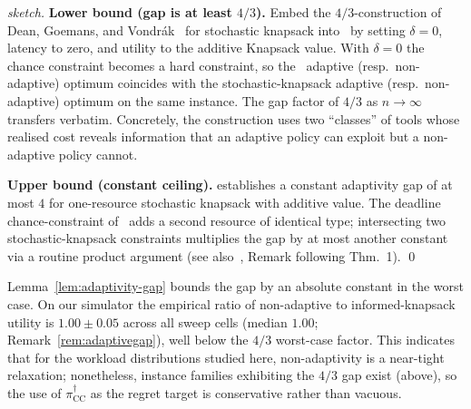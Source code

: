 \begin{proof}[sketch]
\textbf{Lower bound (gap is at least $4/3$).}
Embed the $4/3$-construction of Dean, Goemans, and
Vondr\'{a}k~\cite[Sec.~5]{dean2008stochastic} for stochastic knapsack
into \CBSLAO~by setting $\delta = 0$, latency to zero, and utility to
the additive Knapsack value. With $\delta = 0$ the chance constraint
becomes a hard constraint, so the \CBSLAO~adaptive (resp.\
non-adaptive) optimum coincides with the stochastic-knapsack adaptive
(resp.\ non-adaptive) optimum on the same instance. The gap factor of
$4/3$ as $n \to \infty$ transfers verbatim. Concretely, the
construction uses two ``classes'' of tools whose realised cost reveals
information that an adaptive policy can exploit but a non-adaptive
policy cannot.

\textbf{Upper bound (constant ceiling).}
\cite[Thm.~1]{dean2008stochastic} establishes a constant adaptivity
gap of at most $4$ for one-resource stochastic knapsack with additive
value. The deadline chance-constraint of \CBSLAO~adds a second
resource of identical type; intersecting two stochastic-knapsack
constraints multiplies the gap by at most another constant via a
routine product argument (see also~\cite{dean2008stochastic}, Remark
following Thm.~1).
\qed
\end{proof}

\begin{remark}
\label{rem:gap-empirical}
Lemma~\ref{lem:adaptivity-gap} bounds the gap by an absolute constant
in the worst case. On our simulator the empirical ratio of
non-adaptive to informed-knapsack utility is
$1.00 \pm 0.05$ across all sweep cells (median $1.00$;
Remark~\ref{rem:adaptivegap}), well below the $4/3$ worst-case factor.
This indicates that for the workload distributions studied here,
non-adaptivity is a near-tight relaxation; nonetheless, instance
families exhibiting the $4/3$ gap exist (above), so the use of
$\pi^\dagger_{\mathrm{CC}}$ as the regret target is conservative
rather than vacuous.
\end{remark}
